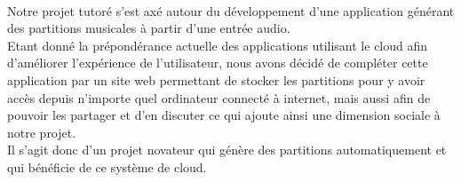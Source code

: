 \paragraph{}
Notre projet tutoré s'est axé autour du développement d'une application générant des partitions musicales à partir d'une entrée audio. \\
Etant donné la prépondérance actuelle des applications utilisant le cloud afin d'améliorer l'expérience de l'utilisateur, nous avons décidé de compléter cette application par un site web permettant de stocker les partitions pour y avoir accès depuis n'importe quel ordinateur connecté à internet, mais aussi afin de pouvoir les partager et d'en discuter ce qui ajoute ainsi une dimension sociale à notre projet. \\
Il s'agit donc d'un projet novateur qui génère des partitions automatiquement et qui bénéficie de ce  système de cloud.